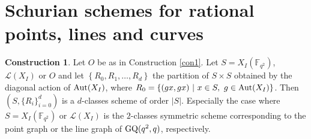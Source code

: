 \documentclass[11pt]{amsart}
\theoremstyle{plain} %
\theoremstyle{definition} %
\newtheorem{const}{Construction}
\theoremstyle{remark} %
\begin{document}
\section{Schurian schemes for rational points, lines and curves}
\begin{const}
\label{con3}
Let $O$ be as in Construction \ref{con1}. Let $S=X_I(\mathbb{F}_{q^2})$, $\mathcal{L}(X_I)$ or $O$ and let
$\left\{R_0,R_1,\dots,R_d\right\}$ the partition of $S\times S$ obtained by the diagonal action of ${\rm Aut}(X_I)$, where $R_0=\left\{(gx,gx)\ \middle\vert\ x\in S,\ g\in{\rm Aut}(X_I)\right\}$. Then $(S,\{R_i\}_{i=0}^d)$ is a $d$-classes scheme of order $|S|$. Especially the case where $S=X_I(\mathbb{F}_{q^2})$ or $\mathcal{L}(X_I)$ is the $2$-classes symmetric scheme corresponding to the point graph or the line graph of ${\rm GQ}(q^2,q)$, respectively.
\end{const}
\end{document}
